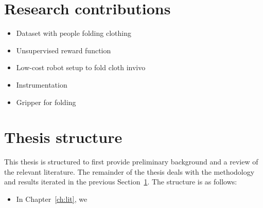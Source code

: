 \documentclass[\home/main.tex]{subfiles}
\begin{document}
\section{Research contributions} \label{sec:intro_contributions}
\begin{itemize}
    \item Dataset with people folding clothing
    \item Unsupervised reward function
    \item Low-cost robot setup to fold cloth invivo
    \item Instrumentation
    \item Gripper for folding
\end{itemize}

\section{Thesis structure}
This thesis is structured to first provide preliminary background and a review of the relevant literature. The remainder of the thesis deals with the methodology and results iterated in the previous Section~\ref{sec:intro_contributions}. The structure is as follows:
\begin{itemize}
    \item In Chapter~\ref{ch:lit}, we
\end{itemize}
\end{document}
